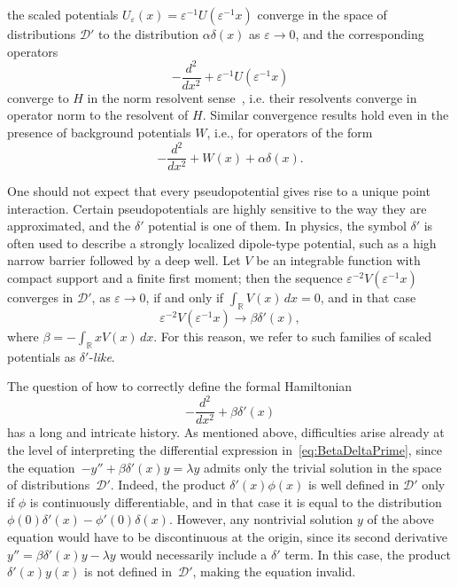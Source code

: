 \documentclass[reqno]{amsart}
\theoremstyle{definition}
\theoremstyle{remark}
\numberwithin{equation}{section}
\newcommand{\Real}{\mathbb R}
\newcommand{\eps}{\varepsilon}
\newcommand{\cD}{\mathcal{D}}
\begin{document}
the scaled potentials $U_\eps(x) = \eps^{-1} U(\eps^{-1}x)$ converge in the space of distributions $\cD'$ to the distribution $\alpha\delta(x)$ as $\eps\to 0$, and the corresponding operators
\begin{equation*}
  - \frac{d^2}{dx^2} + \eps^{-1} U(\eps^{-1}x)
\end{equation*}
converge to $H$ in the norm resolvent sense~\cite[Theorem~I.3.2.3]{Albeverio2edition}, i.e. their resolvents converge in operator norm to the resolvent of $H$. Similar convergence results hold even in the presence of background potentials $W$, i.e., for operators of the form
\begin{equation*}
	- \frac{d^2}{dx^2} + W(x) + \alpha \delta(x).
\end{equation*}


One should not expect that every pseudopotential gives rise to a unique point interaction. Certain pseudopotentials are highly sensitive to the way they are approximated, and the $\delta'$ potential is one of them. In physics, the symbol $\delta'$ is often used to describe a strongly localized dipole-type potential, such as a high narrow barrier followed by a deep well. Let $V$ be an integrable function with compact support and a finite first moment; then the sequence $\eps^{-2} V(\eps^{-1}x)$ converges in $\cD'$, as $\eps\to0$, if and only if $\int_\Real V(x) \,dx=0$, and in that case
\begin{equation}\label{DeltaPrimeConv}
  \eps^{-2} V(\eps^{-1}x)\to \beta \delta'(x),
\end{equation}
where $\beta=-\int_\Real x V(x)\,dx$. For this reason, we refer to such families of scaled potentials as $\delta'$-\textit{like}.


The question of how to correctly define the formal Hamiltonian
\begin{equation}\label{eq:BetaDeltaPrime}
	- \frac{d^2}{dx^2} + \beta \delta'(x)
\end{equation}
has a long and intricate history. As mentioned above, difficulties arise already at the level of interpreting the differential expression in~\eqref{eq:BetaDeltaPrime}, since the equation~$-y''+\beta\delta'(x)y=\lambda y$ admits only the trivial solution in the space of distributions~$\cD'$. Indeed, the product $\delta'(x)\phi(x)$ is well defined in $\cD'$ only if $\phi$ is continuously differentiable, and in that case it is equal to the distribution $\phi(0)\delta'(x) - \phi'(0)\delta(x)$. However, any nontrivial solution $y$ of the above equation would have to be discontinuous at the origin, since its second derivative $y'' = \beta\delta'(x)y - \lambda y$ would necessarily include a $\delta'$ term. In this case, the product $\delta'(x) y(x)$ is not defined in~$\cD'$, making the equation invalid.
\end{document}
